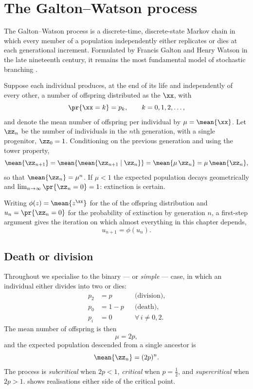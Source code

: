 \section{The Galton--Watson process}
\label{sec:gw}

The Galton--Watson process is a discrete-time, discrete-state Markov chain in which
every member of a population independently either replicates or dies at each
generational increment. Formulated by Francis Galton and Henry Watson in the late
nineteenth century, it remains the most fundamental model of stochastic branching
\cite{Athreya1972,Harris1963}.

Suppose each individual produces, at the end of its life and independently of every
other, a number of offspring distributed as the \rv{} $\xx$, with
\begin{equation*}
\pr{\xx = k} = p_k,\qquad k = 0,1,2,\dots,
\end{equation*}
and denote the mean number of offspring per individual by $\mu = \mean{\xx}$. Let
$\zz_n$ be the number of individuals in the $n$th generation, with a single
progenitor, $\zz_0=1$. Conditioning on the previous generation and using the tower
property,
\begin{equation*}
\mean{\zz_{n+1}} = \mean{\mean{\zz_{n+1}\mid \zz_n}} = \mean{\mu\,\zz_n} = \mu\,\mean{\zz_n},
\end{equation*}
so that $\mean{\zz_n} = \mu^n$. If $\mu<1$ the expected population decays
geometrically and $\lim_{n\to\infty}\pr{\zz_n=0}=1$: extinction is certain.

Writing $\phi(z) = \mean{z^{\xx}}$ for the \pgf{} of the offspring distribution and
$u_n = \pr{\zz_n = 0}$ for the probability of extinction by generation $n$, a
first-step argument gives the iteration on which almost everything in this chapter
depends,
\begin{equation}
\label{iterPGF}
u_{n+1} = \phi(u_n).
\end{equation}

\subsection{Death or division}
\label{sec:deathordivision}

Throughout we specialise to the binary --- or \emph{simple} --- case, in which an
individual either divides into two or dies:
\begin{align*}
p_2 &= p &&\text{(division)},\\
p_0 &= 1-p &&\text{(death)},\\
p_i &= 0 &&\forall\, i\neq 0,2.
\end{align*}
The mean number of offspring is then
\begin{equation*}
\mu = 2p,
\end{equation*}
and the expected population descended from a single ancestor is
\begin{equation}
\label{eq:meanZn}
\mean{\zz_n} = (2p)^n.
\end{equation}
The process is \emph{subcritical} when $2p<1$, \emph{critical} when $p=\tfrac12$, and
\emph{supercritical} when $2p>1$.  shows realisations either side of
the critical point.


